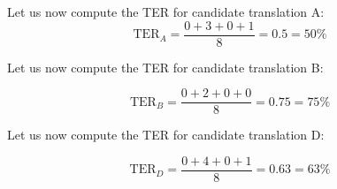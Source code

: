 \documentclass[output=paper]{langscibook}
\begin{document}
Let us now compute the TER for candidate translation A:
\begin{equation}
\text{TER}_A=\frac{0+3+0+1}{8}=0.5=50\%
\end{equation}



\begin{table}[H]
\caption{operations needed to transform candidate B into reference.}
\label{tab:rossi:6}
\end{table}

Let us now compute the TER for candidate translation B:

\begin{equation}
\text{TER}_B=\frac{0+2+0+0}{8}=0.75=75\%
\end{equation}



\begin{table}[H]
\caption{operations needed to transform candidate D into reference.}
\label{tab:rossi:7}
\end{table}

Let us now compute the TER for candidate translation D:

\begin{equation}
\text{TER}_D=\frac{0+4+0+1}{8}=0.63=63\%
\end{equation}
\end{document}
